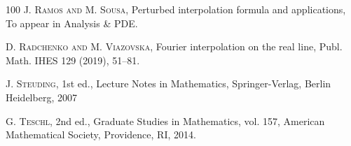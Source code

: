 \documentclass[a4paper,reqno,12pt]{amsart}
\newcommand{\1}{{\bf 1}}
\begin{document}
\begin{thebibliography}{100}
\textsc{J. Ramos and M. Sousa}, Perturbed interpolation formula and applications, To appear in Analysis \& PDE.

\textsc{D. Radchenko and M. Viazovska}, Fourier interpolation on the real line, Publ. Math. IHES 129 (2019), 51–81.

\textsc{J. Steuding},
\newblock 1st ed., Lecture Notes in Mathematics, Springer-Verlag, Berlin Heidelberg, 2007

\textsc{G. Teschl},
\newblock 2nd ed., Graduate Studies in Mathematics, vol. 157, American Mathematical Society, Providence, RI, 2014.
    
\end{thebibliography}
\end{document}
